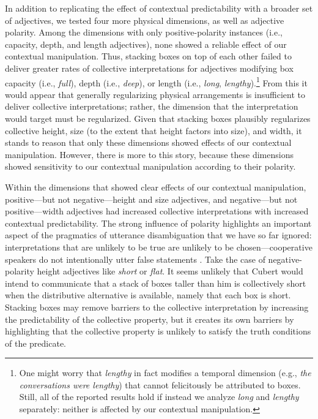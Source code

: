 \documentclass[preprint,12pt,authoryear,titlepage]{elsarticle}
\begin{document}
In addition to replicating the effect of contextual predictability with a broader set of adjectives, we tested four more physical dimensions, as well as adjective polarity. Among the dimensions with only positive-polarity instances (i.e., capacity, depth, and length adjectives), none showed a reliable effect of our contextual manipulation. Thus, stacking boxes on top of each other failed to deliver greater rates of collective interpretations for adjectives modifying box capacity (i.e., \emph{full}), depth (i.e., \emph{deep}), or length (i.e., \emph{long}, \emph{lengthy}).\footnote{One might worry that \emph{lengthy} in fact modifies a temporal dimension (e.g., \emph{the conversations were lengthy}) that cannot felicitously be attributed to boxes. Still, all of the reported results hold if instead we analyze \emph{long} and \emph{lengthy} separately: neither is affected by our contextual manipulation.} 
From this it would appear that generally regularizing physical arrangements is insufficient to deliver collective interpretations; rather, the dimension that the interpretation would target must be regularized. Given that stacking boxes plausibly regularizes collective height, size (to the extent that height factors into size), and width, it stands to reason that only these dimensions showed effects of our contextual manipulation. However, there is more to this story, because these dimensions showed sensitivity to our contextual manipulation according to their polarity.

Within the dimensions that showed clear effects of our contextual manipulation, positive---but not negative---height and size adjectives, and negative---but not positive---width adjectives had increased collective interpretations with increased contextual predictability. The strong influence of polarity highlights an important aspect of the pragmatics of utterance disambiguation that we have so far ignored: interpretations that are unlikely to be true are unlikely to be chosen---cooperative speakers do not intentionally utter false statements \citep{grice1975}. Take the case of negative-polarity height adjectives like \emph{short} or \emph{flat}. It seems unlikely that Cubert would intend to communicate that a stack of boxes taller than him is collectively short when the distributive alternative is available, namely that each box is short. Stacking boxes may remove barriers to the collective interpretation by increasing the predictability of the collective property, but it creates its own barriers by highlighting that the collective property is unlikely to satisfy the truth conditions of the predicate.
\end{document}
